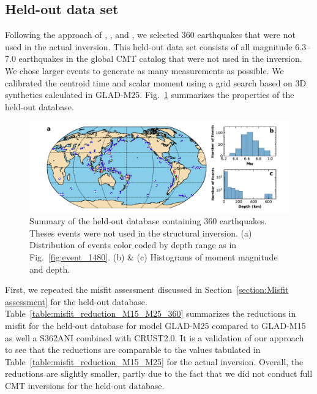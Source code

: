 \documentclass[extra,mreferee]{gji}
\begin{document}
\subsection{Held-out data set}

Following the approach of \cite{tape2009adjoint}, \cite{chen2015multiparameter},
and \cite{bozdaug2016global}, we selected 360 earthquakes that were not used
in the actual inversion. This held-out data set consists of all magnitude 6.3--7.0
earthquakes in the global CMT catalog that were not used in the inversion.
We chose larger events to generate as many measurements as possible.
We calibrated the centroid time and scalar moment using a grid search based on
3D synthetics calculated in GLAD-M25.
Fig.~\ref{fig:events_360} summarizes the properties of the held-out database.

\begin{figure}
  \centering
  \includegraphics[width=\textwidth]{figures/events_360.pdf}
  \caption{Summary of the held-out database containing 360 earthquakes. Theses events were not used in the structural inversion. (a) Distribution of events color coded by depth range as in Fig.~\ref{fig:event_1480}. (b) \& (c) Histograms of moment magnitude and depth.}
  \label{fig:events_360}
\end{figure}

First, we repeated the misfit assessment discussed in
Section~\ref{section:Misfit assessment} for the held-out database.
Table~\ref{table:misfit_reduction_M15_M25_360} summarizes the reductions
in misfit for the held-out database for model GLAD-M25 compared to GLAD-M15
as well a S362ANI combined with CRUST2.0.
It is a validation of our approach to see that the reductions are comparable to the
values tabulated in Table~\ref{table:misfit_reduction_M15_M25} for the actual inversion.
Overall, the reductions are slightly smaller, partly due to the fact that we did not
conduct full CMT inversions for the held-out database.
\end{document}
